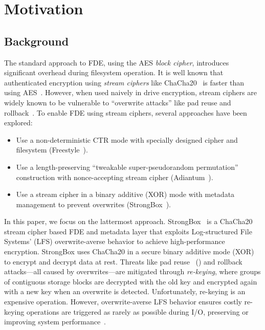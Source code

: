 \section{Motivation}\label{sec:motivation}

\subsection{Background}

The standard approach to FDE, using the AES \emph{block cipher}, introduces
significant overhead during filesystem operation. It is well known that
authenticated encryption using \emph{stream ciphers} like
ChaCha20~\cite{ChaCha20} is faster than using AES~\cite{StrongBox, AnotherPaper,
AnotherPaper}. However, when used naively in drive encryption, stream ciphers
are widely known to be vulnerable to ``overwrite attacks'' like pad reuse and
rollback~\cite{KatzLindell, StrongBox}. To enable FDE using stream ciphers,
several approaches have been explored:

\begin{itemize}
   \item Use a non-deterministic CTR mode with specially designed cipher and
   filesystem (Freestyle~\cite{Freestyle}).
   \item Use a length-preserving ``tweakable super-pseudorandom permutation''
   construction with nonce-accepting stream cipher (Adiantum~\cite{Adiantum}).
   \item Use a stream cipher in a binary additive (XOR) mode with metadata
   management to prevent overwrites (StrongBox~\cite{StrongBox}).
\end{itemize}

In this paper, we focus on the lattermost approach. StrongBox~\cite{StrongBox}
is a ChaCha20 stream cipher based FDE and metadata layer that exploits
Log-structured File Systems' (LFS) overwrite-averse behavior to achieve
high-performance encryption. StrongBox uses ChaCha20 in a secure binary additive
mode (XOR) to encrypt and decrypt data at rest. Threats like pad
reuse~\cite{KatzLindell} () and rollback attacks---all caused
by overwrites---are mitigated through \emph{re-keying}, where groups of
contiguous storage blocks are decrypted with the old key and encrypted again
with a new key when an overwrite is detected. Unfortunately, re-keying is an
expensive operation. However, overwrite-averse LFS behavior ensures costly
re-keying operations are triggered as rarely as possible during I/O, preserving
or improving system performance~\cite{StrongBox}. 

